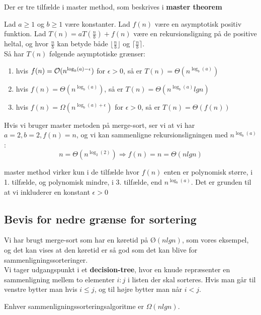 Der er tre tilfælde i master method, som beskrives i \textbf{master theorem}
\begin{theorem}
  Lad $a \geq 1$ og $b \geq 1$ være konstanter. Lad $f(n)$ være en asymptotisk positiv funktion. Lad $T(n) = aT(\frac{n}{b}) + f(n)$ være en rekursionsligning på de positive heltal, og hvor $\frac{n}{b}$ kan betyde både $\lfloor \frac{n}{b}\rfloor$ og $\lceil \frac{n}{b}\rceil$.\\
  Så har $T(n)$ følgende asymptotiske grænser:
  \begin{enumerate}
  \item hvis $f(n) = \mathcal{O}(n^{\log_b(a) - \epsilon})$ for $\epsilon > 0$, så er $T(n) = \Theta(n^{\log_b(a)})$
  \item hvis $f(n) = \Theta(n^{\log_b(a)})$, så er $T(n) = \Theta(n^{\log_b(a)}lgn)$
  \item hvis $f(n) = \Omega(n^{\log_b(a) + \epsilon})$ for $\epsilon > 0$, så er $T(n) = \Theta(f(n))$
  \end{enumerate}
\end{theorem}

Hvis vi bruger master metoden på merge-sort, ser vi at vi har $a = 2, b=2, f(n)=n$, og vi kan sammenligne rekursionsligningen med $n^{\log_b(a)}$:
$$n = \Theta(n^{\log_2(2)}) \Rightarrow f(n) = n = \Theta(nlgn)$$

master method virker kun i de tilfælde hvor $f(n)$ enten er polynomisk større, i 1. tilfælde, og polynomisk mindre, i 3. tilfælde, end $n^{\log_b(a)}$. Det er grunden til at vi inkluderer en konstant $\epsilon > 0$

\subsection{Bevis for nedre grænse for sortering}
Vi har brugt merge-sort som har en køretid på $Ø(nlgn)$, som vores eksempel, og det kan vises at den køretid er så god som det kan blive for sammenligningssorteringer.\\

Vi tager udgangspunkt i et \textbf{decision-tree}, hvor en knude repræsenter en sammenligning mellem to elementer $i:j$ i listen der skal sorteres. Hvis man går til venstre bytter man hvis $i \leq j$, og til højre bytter man når $i < j$.
\begin{theorem}
  Enhver sammenligningssorteringsalgoritme er $\Omega(nlgn)$.
\end{theorem}

